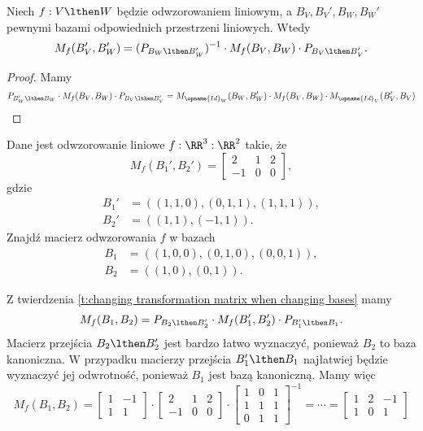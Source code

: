 \begin{theorem}
    \label{t:changing transformation matrix when changing bases}
    Niech $f: V \lthen W$ będzie odwzorowaniem liniowym, a $B_V, B_V', B_W, B_W'$ pewnymi bazami odpowiednich przestrzeni liniowych. Wtedy
    \[ M_f(B_V', B_W') = (P_{B_W \lthen B_W'})^{-1} \cdot M_f(B_V, B_W) \cdot P_{B_V \lthen B_V'}. \]
\end{theorem}
\begin{proof}
    Mamy
    \[ P_{B_W' \lthen B_W} \cdot M_f(B_V, B_W) \cdot P_{B_V \lthen B_V'} = M_{\opname{Id}_W}(B_W, B_W') \cdot M_f(B_V, B_W) \cdot M_{\opname{Id}_V}(B_V', B_V) \]
\end{proof}

\begin{example}
    Dane jest odwzorowanie liniowe $f : \RR^3 : \RR^2$ takie, że
    \[ M_f(B_1', B_2') = \begin{bmatrix}
        2 & 1 & 2 \\
        -1 & 0 & 0
    \end{bmatrix}, \]
    gdzie
    \begin{align*}
        B_1' &= ((1, 1, 0), (0, 1, 1), (1, 1, 1)), \\
        B_2' &= ((1, 1), (-1, 1)).
    \end{align*}
    Znajdź macierz odwzorowania $f$ w bazach
    \begin{align*}
        B_1 &= ((1, 0, 0), (0, 1, 0), (0, 0, 1)), \\
        B_2 &= ((1, 0), (0, 1)).
    \end{align*}
\end{example}
\begin{solution}
    Z twierdzenia \ref{t:changing transformation matrix when changing bases} mamy
    \[ M_f(B_1, B_2) = P_{B_2 \lthen B_2'} \cdot M_f(B_1', B_2') \cdot P_{B_1' \lthen B_1}. \]
    Macierz przejścia $B_2 \lthen B_2'$ jest bardzo łatwo wyznaczyć, ponieważ $B_2$ to baza kanoniczna. W przypadku macierzy przejścia $B_1' \lthen B_1$ najłatwiej będzie wyznaczyć jej odwrotność, ponieważ $B_1$ jest bazą kanoniczną. Mamy więc
    \[ M_f(B_1, B_2) = \begin{bmatrix}
        1 & -1 \\
        1 & 1
    \end{bmatrix} \cdot \begin{bmatrix}
        2 & 1 & 2 \\
        -1 & 0 & 0
    \end{bmatrix} \cdot \begin{bmatrix}
        1 & 0 & 1\\
        1 & 1 & 1\\
        0 & 1 & 1
    \end{bmatrix}^{-1} = \cdots = \begin{bmatrix}
        1 & 2 & -1 \\
        1 & 0 & 1
    \end{bmatrix} \]
\end{solution}


